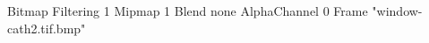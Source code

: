 {Bitmap
	{Filtering 1}
	{Mipmap 1}
	{Blend none}
	{AlphaChannel 0}
	{Frame "window-cath2.tif.bmp"}
}

